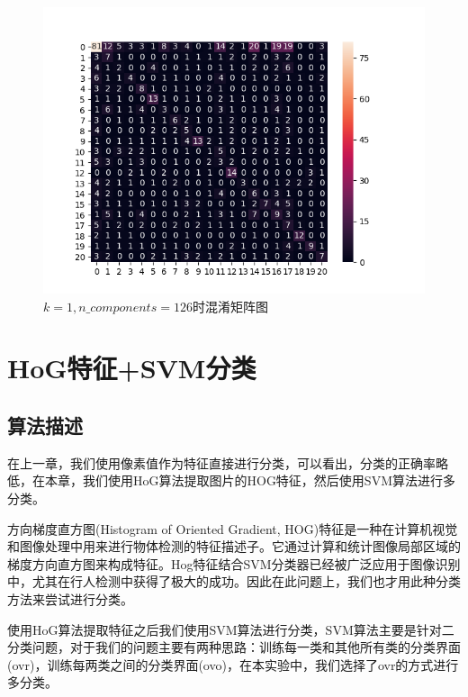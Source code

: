 \documentclass[cn]{elegantbook}
\begin{document}
\begin{figure}[!h]
	\centering
	\includegraphics[width=0.9\linewidth]{../results/cm_1_open}
	\caption{\label{cm_1_open}$k=1, n\_components=126$时混淆矩阵图}
\end{figure}
\chapter{HoG特征+SVM分类}
\section{算法描述}
在上一章，我们使用像素值作为特征直接进行分类，可以看出，分类的正确率略低，在本章，我们使用HoG算法提取图片的HOG特征，然后使用SVM算法进行多分类。

方向梯度直方图(Histogram of Oriented Gradient, HOG)特征是一种在计算机视觉和图像处理中用来进行物体检测的特征描述子。它通过计算和统计图像局部区域的梯度方向直方图来构成特征。Hog特征结合SVM分类器已经被广泛应用于图像识别中，尤其在行人检测中获得了极大的成功。因此在此问题上，我们也才用此种分类方法来尝试进行分类。

使用HoG算法提取特征之后我们使用SVM算法进行分类，SVM算法主要是针对二分类问题，对于我们的问题主要有两种思路：训练每一类和其他所有类的分类界面(ovr)，训练每两类之间的分类界面(ovo)，在本实验中，我们选择了ovr的方式进行多分类。
\end{document}
